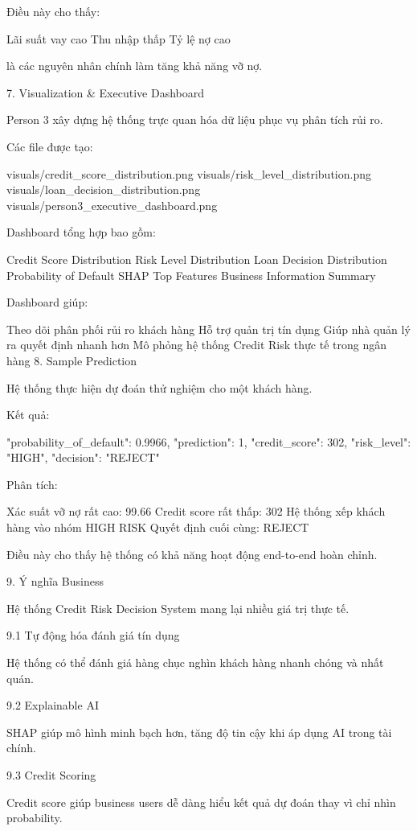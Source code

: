 Điều này cho thấy:

Lãi suất vay cao
Thu nhập thấp
Tỷ lệ nợ cao

là các nguyên nhân chính làm tăng khả năng vỡ nợ.

7. Visualization & Executive Dashboard

Person 3 xây dựng hệ thống trực quan hóa dữ liệu phục vụ phân tích rủi ro.

Các file được tạo:

visuals/credit_score_distribution.png
visuals/risk_level_distribution.png
visuals/loan_decision_distribution.png
visuals/person3_executive_dashboard.png

Dashboard tổng hợp bao gồm:

Credit Score Distribution
Risk Level Distribution
Loan Decision Distribution
Probability of Default
SHAP Top Features
Business Information Summary

Dashboard giúp:

Theo dõi phân phối rủi ro khách hàng
Hỗ trợ quản trị tín dụng
Giúp nhà quản lý ra quyết định nhanh hơn
Mô phỏng hệ thống Credit Risk thực tế trong ngân hàng
8. Sample Prediction

Hệ thống thực hiện dự đoán thử nghiệm cho một khách hàng.

Kết quả:

{
  "probability_of_default": 0.9966,
  "prediction": 1,
  "credit_score": 302,
  "risk_level": "HIGH",
  "decision": "REJECT"
}

Phân tích:

Xác suất vỡ nợ rất cao: 99.66%
Credit score rất thấp: 302
Hệ thống xếp khách hàng vào nhóm HIGH RISK
Quyết định cuối cùng: REJECT

Điều này cho thấy hệ thống có khả năng hoạt động end-to-end hoàn chỉnh.

9. Ý nghĩa Business

Hệ thống Credit Risk Decision System mang lại nhiều giá trị thực tế.

9.1 Tự động hóa đánh giá tín dụng

Hệ thống có thể đánh giá hàng chục nghìn khách hàng nhanh chóng và nhất quán.

9.2 Explainable AI

SHAP giúp mô hình minh bạch hơn, tăng độ tin cậy khi áp dụng AI trong tài chính.

9.3 Credit Scoring

Credit score giúp business users dễ dàng hiểu kết quả dự đoán thay vì chỉ nhìn probability.

